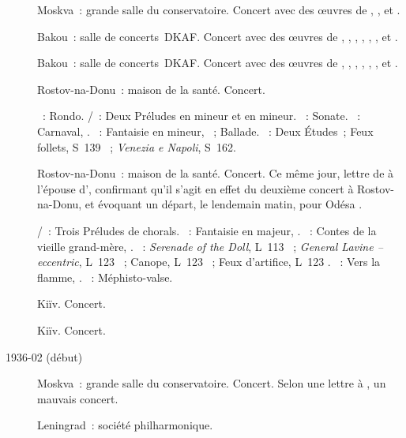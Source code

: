 \begin{description}
 \item[]
 Moskva~: grande salle du conservatoire.
 Concert avec des œuvres de \JBach{}, \Schumann{}, \Chopin{} et \Liszt{}.
 \item[]
 Bakou~: salle de concerts~DKAF.
 Concert avec des œuvres de \JBach{}, \Haydn{}, \Schumann{}, \Chopin{},
 \Liszt{}, \Debussy{}, \Prokofiev{} et \Scriabine{}.
 \item[]
 Bakou~: salle de concerts~DKAF.
 Concert avec des œuvres de \JBach{}, \Haydn{}, \Schumann{}, \Chopin{},
 \Liszt{}, \Debussy{}, \Prokofiev{} et \Scriabine{}.
 \item[]
 Rostov-na-Donu~: maison de la santé.
 Concert.

 \textsc{\JBach{}}~: Rondo.
 \textsc{\JBach{}/\Ziloti{}}~: Deux Préludes en \kE mineur et en \kB mineur.
 \textsc{\Haydn{}}~: Sonate.
 \textsc{\Schumann{}}~: Carnaval, .
 \textsc{\Chopin{}}~: Fantaisie en \kF mineur, ~; Ballade.
 \textsc{\Liszt{}}~: Deux Études~; Feux follets, S~139 ~;
 \emph{Venezia e Napoli}, S~162.
 \item[]
 Rostov-na-Donu~: maison de la santé.
 Concert.
 Ce même jour, lettre de \VSofronitsky{} à l'épouse d'\EVizel{}, confirmant
 qu'il s'agit en effet du deuxième concert à Rostov-na-Donu, et évoquant un
 départ, le lendemain matin, pour Odésa \citep[voir][p.~157]{Nekrasova08}.

 \textsc{\JBach{}/\Busoni{}}~: Trois Préludes de chorals.
 \textsc{\Schumann{}}~: Fantaisie en \kC majeur, .
 \textsc{\Prokofiev{}}~: Contes de la vieille grand-mère, .
 \textsc{\Debussy{}}~: \emph{Serenade of the Doll}, L~113 ~;
 \emph{General Lavine -- eccentric}, L~123 ~; Canope, L~123
 ~; Feux d'artifice, L~123 .
 \textsc{\Scriabine{}}~: Vers la flamme, .
 \textsc{\Liszt{}}~: Méphisto-valse.
 \item[]
 Kiïv.
 Concert.
 \item[]
 Kiïv.
 Concert.
 \item[1936-02 (début)]
 Moskva~: grande salle du conservatoire.
 Concert.
 Selon une lettre à \ESofronitskaya{}, un mauvais concert.
 \item[]
 Leningrad~: société philharmonique.


\end{description}
